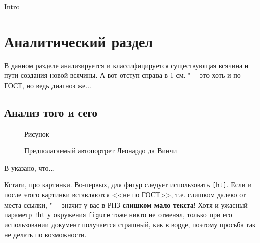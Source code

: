 Intro







\chapter{Аналитический раздел}
\label{cha:analysis}
%
%
В данном разделе анализируется и классифицируется существующая всячина и пути создания новой всячины. А вот отступ справа в 1 см. "--- это хоть и по ГОСТ, но ведь диагноз же...

\section{Анализ того и сего}


\begin{figure}
  \centering
  \caption{Рисунок}
  \label{fig:fig01}
\end{figure}

\begin{figure}
  \centering
  \caption{Предполагаемый автопортрет Леонардо да Винчи}
  \label{fig:leonardo}
\end{figure}

В \cite{Pup09} указано, что...

Кстати, про картинки. Во-первых, для фигур следует использовать \texttt{[ht]}. Если и после этого картинки вставляются <<не по ГОСТ>>, т.е. слишком далеко от места ссылки, "--- значит у вас в РПЗ \textbf{слишком мало текста}! Хотя и ужасный параметр \texttt{!ht} у окружения \texttt{figure} тоже никто не отменял, только при его использовании документ получается страшный, как в ворде, поэтому просьба так не делать по возможности.

